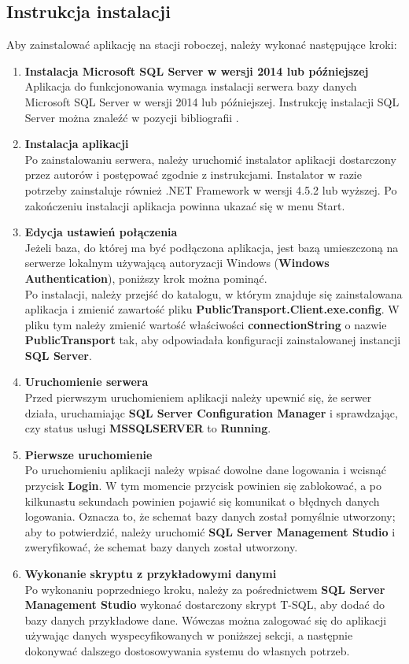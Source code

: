 \documentclass[10pt,a4paper]{article}
\begin{document}
\subsection{Instrukcja instalacji} %
Aby zainstalować aplikację na stacji roboczej, należy wykonać następujące kroki:

\begin{enumerate}
	\item \textbf{Instalacja Microsoft SQL Server w wersji 2014 lub późniejszej} \\
	Aplikacja do funkcjonowania wymaga instalacji serwera bazy danych Microsoft SQL Server w wersji 2014 lub późniejszej. Instrukcję instalacji SQL Server można znaleźć w pozycji bibliografii \cite{sqlserver}.
	\item \textbf{Instalacja aplikacji} \\
	Po zainstalowaniu serwera, należy uruchomić instalator aplikacji dostarczony przez autorów i postępować zgodnie z instrukcjami. Instalator w razie potrzeby zainstaluje również .NET Framework w wersji 4.5.2 lub wyższej. Po zakończeniu instalacji aplikacja powinna ukazać się w menu Start.
	\item \textbf{Edycja ustawień połączenia} \\
	Jeżeli baza, do której ma być podłączona aplikacja, jest bazą umieszczoną na serwerze lokalnym używającą autoryzacji Windows (\textbf{Windows Authentication}), poniższy krok można pominąć. \\
	Po instalacji, należy przejść do katalogu, w którym znajduje się zainstalowana aplikacja i zmienić zawartość pliku \textbf{PublicTransport.Client.exe.config}. W pliku tym należy zmienić wartość właściwości \textbf{connectionString} o nazwie \textbf{PublicTransport} tak, aby odpowiadała konfiguracji zainstalowanej instancji \textbf{SQL Server}.
	\item \textbf{Uruchomienie serwera} \\
	Przed pierwszym uruchomieniem aplikacji należy upewnić się, że serwer działa, uruchamiając \textbf{SQL Server Configuration Manager} i sprawdzając, czy status usługi \textbf{MSSQLSERVER} to \textbf{Running}.
	\item \textbf{Pierwsze uruchomienie} \\
	Po uruchomieniu aplikacji należy wpisać dowolne dane logowania i wcisnąć przycisk \textbf{Login}. W tym momencie przycisk powinien się zablokować, a po kilkunastu sekundach powinien pojawić się komunikat o błędnych danych logowania. Oznacza to, że schemat bazy danych został pomyślnie utworzony; aby to potwierdzić, należy uruchomić \textbf{SQL Server Management Studio} i zweryfikować, że schemat bazy danych został utworzony.
	\item \textbf{Wykonanie skryptu z przykładowymi danymi} \\
	Po wykonaniu poprzedniego kroku, należy za pośrednictwem \textbf{SQL Server Management Studio} wykonać dostarczony skrypt T-SQL, aby dodać do bazy danych przykładowe dane. Wówczas można zalogować się do aplikacji używając danych wyspecyfikowanych w poniższej sekcji, a następnie dokonywać dalszego dostosowywania systemu do własnych potrzeb.
\end{enumerate}
\end{document}
